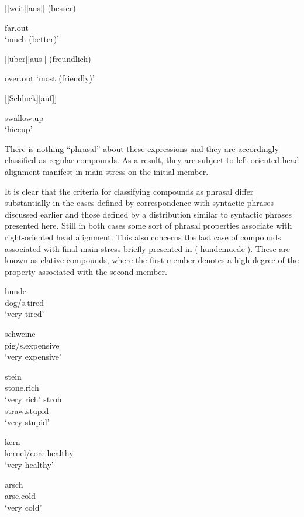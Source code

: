 \documentclass[output=paper
 ,nobabel
 ,draftmode
 ,colorlinks, citecolor=brown
]{langscibook}
\begin{document}
\ex {}[[weit][aus]] (besser) 

far.out\\
`much (better)'


\ex {}[[über][aus]] (freundlich) 

over.out
`most (friendly)'


\ex {}[[Schluck][auf]] 

swallow.up\\
`hiccup'	
\z
\z

\largerpage
\noindent
There is nothing ``phrasal'' about these expressions and they are accordingly classified as regular compounds. As a result, they are subject to left-oriented head alignment manifest in main stress on the initial member. 

It is clear that the criteria for classifying compounds as phrasal differ substantially in the cases defined by correspondence with syntactic phrases discussed earlier and those defined by a distribution similar to syntactic phrases presented here. Still in both cases some sort of phrasal properties associate with right-oriented head alignment. This also concerns the last case of compounds associated with final main stress briefly presented in (\ref{hundemuede}). These are known as elative compounds, where the first member denotes a high degree of the property associated with the second member.

\begin{multicols}{2}
\ea\label{hundemuede} 
\ea hunde\\
dog/s.tired\\
`very tired'

\ex schweine\\
pig/s.expensive\\
`very expensive'

\ex stein\\
stone.rich\\
`very rich'
%
%
\ex stroh\\
straw.stupid\\
`very stupid'

\ex kern\\
kernel/core.healthy\\
`very healthy'

\ex arsch\\
arse.cold\\
`very cold'
\z
\z
\end{multicols}
\end{document}
